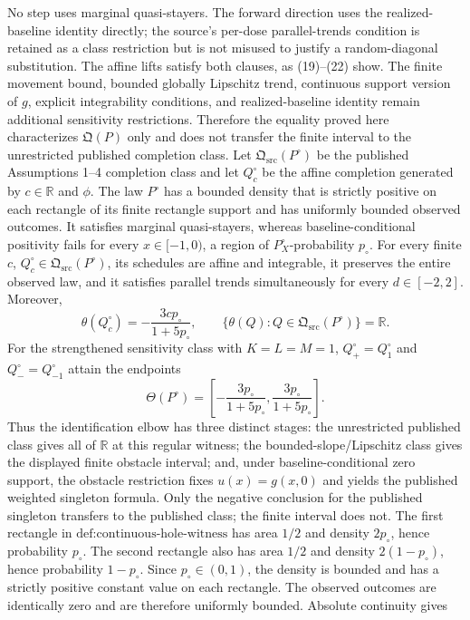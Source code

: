 No step uses marginal quasi-stayers. The forward direction uses the realized-baseline identity directly; the source's per-dose parallel-trends condition is retained as a class restriction but is not misused to justify a random-diagonal substitution. The affine lifts satisfy both clauses, as (19)--(22) show. The finite movement bound, bounded globally Lipschitz trend, continuous support version of \(g\), explicit integrability conditions, and realized-baseline identity remain additional sensitivity restrictions. Therefore the equality proved here characterizes \(\mathfrak Q(P)\) only and does not transfer the finite interval to the unrestricted published completion class.
Let \(\mathfrak Q_{\mathrm{src}}(P^{\circ})\) be the published Assumptions 1--4 completion class and let \(Q_c^{\circ}\) be the affine completion generated by \(c\in\mathbb R\) and \(\phi\). The law \(P^{\circ}\) has a bounded density that is strictly positive on each rectangle of its finite rectangle support and has uniformly bounded observed outcomes. It satisfies marginal quasi-stayers, whereas baseline-conditional positivity fails for every \(x\in[-1,0)\), a region of \(P^{\circ}_X\)-probability \(p_{\circ}\). For every finite \(c\), \(Q_c^{\circ}\in\mathfrak Q_{\mathrm{src}}(P^{\circ})\), its schedules are affine and integrable, it preserves the entire observed law, and it satisfies parallel trends simultaneously for every \(d\in[-2,2]\). Moreover,
\[
\theta(Q_c^{\circ})=-\frac{3c p_{\circ}}{1+5p_{\circ}},
\qquad
\{\theta(Q):Q\in\mathfrak Q_{\mathrm{src}}(P^{\circ})\}=\mathbb R.
\]
For the strengthened sensitivity class with \(K=L=M=1\), \(Q_+^{\circ}=Q_1^{\circ}\) and \(Q_-^{\circ}=Q_{-1}^{\circ}\) attain the endpoints
\[
\Theta(P^{\circ})=
\left[-\frac{3p_{\circ}}{1+5p_{\circ}},
       \frac{3p_{\circ}}{1+5p_{\circ}}\right].
\]
Thus the identification elbow has three distinct stages: the unrestricted published class gives all of \(\mathbb R\) at this regular witness; the bounded-slope/Lipschitz class gives the displayed finite obstacle interval; and, under baseline-conditional zero support, the obstacle restriction fixes \(u(x)=g(x,0)\) and yields the published weighted singleton formula. Only the negative conclusion for the published singleton transfers to the published class; the finite interval does not.
The first rectangle in \(\text{def:continuous-hole-witness}\) has area \(1/2\) and density \(2p_{\circ}\), hence probability \(p_{\circ}\). The second rectangle also has area \(1/2\) and density \(2(1-p_{\circ})\), hence probability \(1-p_{\circ}\). Since \(p_{\circ}\in(0,1)\), the density is bounded and has a strictly positive constant value on each rectangle. The observed outcomes are identically zero and are therefore uniformly bounded. Absolute continuity gives
